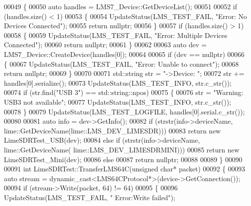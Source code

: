 \begin{DoxyCode}
00049 \{
00050     \textcolor{keyword}{auto} handles = LMS7_Device::GetDeviceList();
00051 
00052     \textcolor{keywordflow}{if} (handles.size() < 1)
00053     \{
00054         UpdateStatus(LMS_TEST_FAIL, \textcolor{stringliteral}{"Error: No Devices Connected"});
00055         \textcolor{keywordflow}{return} \textcolor{keyword}{nullptr};
00056     \}
00057     \textcolor{keywordflow}{if} (handles.size() > 1)
00058     \{
00059         UpdateStatus(LMS_TEST_FAIL, \textcolor{stringliteral}{"Error: Multiple Devices Connected"});
00060         \textcolor{keywordflow}{return} \textcolor{keyword}{nullptr};
00061     \}
00062 
00063     \textcolor{keyword}{auto} dev = LMS7_Device::CreateDevice(handles[0]);
00064 
00065     \textcolor{keywordflow}{if} (dev == \textcolor{keyword}{nullptr})
00066     \{
00067         UpdateStatus(LMS_TEST_FAIL, \textcolor{stringliteral}{"Error: Unable to connect"});
00068         \textcolor{keywordflow}{return} \textcolor{keyword}{nullptr};
00069     \}
00070 
00071     std::string str = \textcolor{stringliteral}{"->Device: "};
00072     str += handles[0].serialize();
00073     UpdateStatus(LMS_TEST_INFO, str.c\_str());
00074     \textcolor{keywordflow}{if} (str.find(\textcolor{stringliteral}{"USB 3"}) == std::string::npos)
00075     \{
00076         str = \textcolor{stringliteral}{"Warning: USB3 not available"};
00077         UpdateStatus(LMS_TEST_INFO, str.c\_str());
00078     \}
00079     UpdateStatus(LMS_TEST_LOGFILE, handles[0].serial.c\_str());
00080 
00081     \textcolor{keyword}{auto} info = dev->GetInfo();
00082     \textcolor{keywordflow}{if} (strstr(info->deviceName, lime::GetDeviceName(lime::LMS_DEV_LIMESDR)))
00083         \textcolor{keywordflow}{return} \textcolor{keyword}{new} LimeSDRTest_USB(dev);
00084     \textcolor{keywordflow}{else} \textcolor{keywordflow}{if} (strstr(info->deviceName, lime::GetDeviceName(
      lime::LMS_DEV_LIMESDRMINI)))
00085         \textcolor{keywordflow}{return} \textcolor{keyword}{new} LimeSDRTest_Mini(dev);
00086     \textcolor{keywordflow}{else}
00087         \textcolor{keywordflow}{return} \textcolor{keyword}{nullptr};
00088 
00089 \}
00090 
00091 \textcolor{keywordtype}{int} LimeSDRTest::TransferLMS64C(\textcolor{keywordtype}{unsigned} \textcolor{keywordtype}{char}* packet)
00092 \{
00093     \textcolor{keyword}{auto} stream = \textcolor{keyword}{dynamic\_cast<}LMS64CProtocol*\textcolor{keyword}{>}(device->GetConnection());
00094     \textcolor{keywordflow}{if} (stream->Write(packet, 64) != 64)
00095     \{
00096         UpdateStatus(LMS_TEST_FAIL, \textcolor{stringliteral}{"  Error:Write failed"});

\end{DoxyCode}
